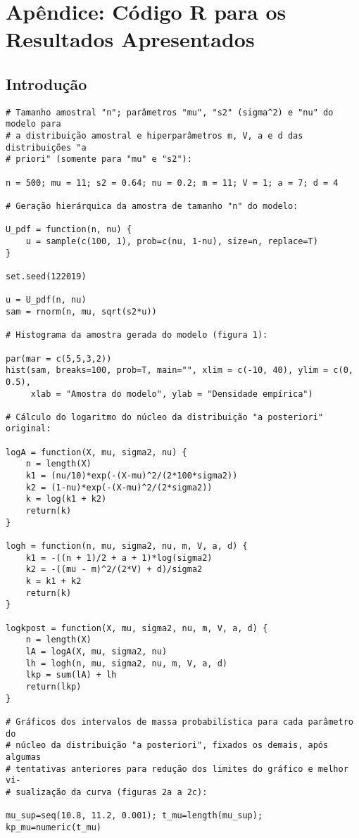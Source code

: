 \section*{Apêndice: Código R para os Resultados Apresentados}

\subsection*{Introdução}

\begin{verbatim}
# Tamanho amostral "n"; parâmetros "mu", "s2" (sigma^2) e "nu" do modelo para
# a distribuição amostral e hiperparâmetros m, V, a e d das distribuições "a
# priori" (somente para "mu" e "s2"):

n = 500; mu = 11; s2 = 0.64; nu = 0.2; m = 11; V = 1; a = 7; d = 4

# Geração hierárquica da amostra de tamanho "n" do modelo:

U_pdf = function(n, nu) {
	u = sample(c(100, 1), prob=c(nu, 1-nu), size=n, replace=T)
}

set.seed(122019)

u = U_pdf(n, nu)
sam = rnorm(n, mu, sqrt(s2*u))

# Histograma da amostra gerada do modelo (figura 1):

par(mar = c(5,5,3,2))
hist(sam, breaks=100, prob=T, main="", xlim = c(-10, 40), ylim = c(0, 0.5),
	 xlab = "Amostra do modelo", ylab = "Densidade empírica")

# Cálculo do logaritmo do núcleo da distribuição "a posteriori" original:

logA = function(X, mu, sigma2, nu) {
	n = length(X)
	k1 = (nu/10)*exp(-(X-mu)^2/(2*100*sigma2))
	k2 = (1-nu)*exp(-(X-mu)^2/(2*sigma2))
	k = log(k1 + k2)
	return(k)
}

logh = function(n, mu, sigma2, nu, m, V, a, d) {
	k1 = -((n + 1)/2 + a + 1)*log(sigma2)
	k2 = -((mu - m)^2/(2*V) + d)/sigma2
	k = k1 + k2
	return(k)
}

logkpost = function(X, mu, sigma2, nu, m, V, a, d) {
	n = length(X)
	lA = logA(X, mu, sigma2, nu)
	lh = logh(n, mu, sigma2, nu, m, V, a, d)
	lkp = sum(lA) + lh
	return(lkp)
}

# Gráficos dos intervalos de massa probabilística para cada parâmetro do
# núcleo da distribuição "a posteriori", fixados os demais, após algumas
# tentativas anteriores para redução dos limites do gráfico e melhor vi-
# sualização da curva (figuras 2a a 2c):

mu_sup=seq(10.8, 11.2, 0.001); t_mu=length(mu_sup); kp_mu=numeric(t_mu)


\end{verbatim}
